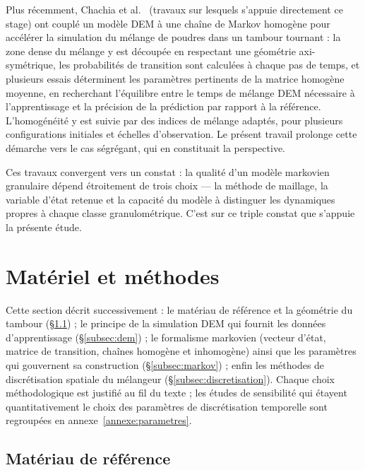 \documentclass[french]{MemoireMaster}
\begin{document}
Plus récemment, Chachia et al.~\cite{chachia2025} (travaux sur lesquels s'appuie directement ce stage) ont couplé un modèle DEM à une chaîne de Markov homogène pour accélérer la simulation du mélange de poudres dans un tambour tournant : la zone dense du mélange y est découpée en respectant une géométrie axi-symétrique, les probabilités de transition sont calculées à chaque pas de temps, et plusieurs essais déterminent les paramètres pertinents de la matrice homogène moyenne, en recherchant l'équilibre entre le temps de mélange DEM nécessaire à l'apprentissage et la précision de la prédiction par rapport à la référence. L'homogénéité y est suivie par des indices de mélange adaptés, pour plusieurs configurations initiales et échelles d'observation. Le présent travail prolonge cette démarche vers le cas ségrégant, qui en constituait la perspective.

Ces travaux convergent vers un constat : la qualité d'un modèle markovien granulaire dépend étroitement de trois choix --- la méthode de maillage, la variable d'état retenue et la capacité du modèle à distinguer les dynamiques propres à chaque classe granulométrique. C'est sur ce triple constat que s'appuie la présente étude.

\section{Matériel et méthodes}
\label{sec:methode}

Cette section décrit successivement : le matériau de référence et la géométrie du tambour (\S\ref{subsec:materiau}) ; le principe de la simulation DEM qui fournit les données d'apprentissage (\S\ref{subsec:dem}) ; le formalisme markovien (vecteur d'état, matrice de transition, chaînes homogène et inhomogène) ainsi que les paramètres qui gouvernent sa construction (\S\ref{subsec:markov}) ; enfin les méthodes de discrétisation spatiale du mélangeur (\S\ref{subsec:discretisation}). Chaque choix méthodologique est justifié au fil du texte ; les études de sensibilité qui étayent quantitativement le choix des paramètres de discrétisation temporelle sont regroupées en annexe~\ref{annexe:parametres}.

\subsection{Matériau de référence}
\label{subsec:materiau}
\end{document}
